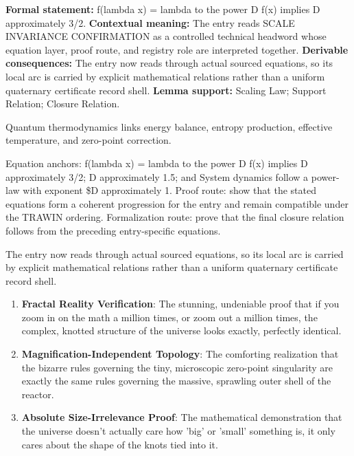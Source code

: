 \begingroup\footnotesize\setlength{\emergencystretch}{3em}\sloppy
\textbf{Formal statement:} f(lambda x) = lambda to the power D f(x) implies D approximately 3/2. \textbf{Contextual meaning:} The entry reads SCALE INVARIANCE CONFIRMATION as a controlled technical headword whose equation layer, proof route, and registry role are interpreted together. \textbf{Derivable consequences:} The entry now reads through actual sourced equations, so its local arc is carried by explicit mathematical relations rather than a uniform quaternary certificate record shell. \textbf{Lemma support:} Scaling Law; Support Relation; Closure Relation.\par
\endgroup

Quantum thermodynamics links energy balance, entropy production, effective temperature, and zero-point correction.

Equation anchors: f(lambda x) = lambda to the power D f(x) implies D approximately 3/2; D approximately 1.5; and System dynamics follow a power-law with exponent \$D approximately 1. Proof route: show that the stated equations form a coherent progression for the entry and remain compatible under the TRAWIN ordering. Formalization route: prove that the final closure relation follows from the preceding entry-specific equations.

The entry now reads through actual sourced equations, so its local arc is carried by explicit mathematical relations rather than a uniform quaternary certificate record shell.
\endgroup

\begin{enumerate}[leftmargin=1.6em,itemsep=6pt,topsep=4pt]
\item \textbf{Fractal Reality Verification}: The stunning, undeniable proof that if you zoom in on the math a million times, or zoom out a million times, the complex, knotted structure of the universe looks exactly, perfectly identical.
\item \textbf{Magnification-Independent Topology}: The comforting realization that the bizarre rules governing the tiny, microscopic zero-point singularity are exactly the same rules governing the massive, sprawling outer shell of the reactor.
\item \textbf{Absolute Size-Irrelevance Proof}: The mathematical demonstration that the universe doesn't actually care how 'big' or 'small' something is, it only cares about the shape of the knots tied into it.
\end{enumerate}

